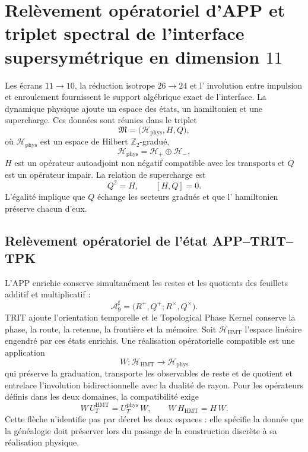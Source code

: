 \section[APP relevée et triplet spectral en dimension 11]{Relèvement opératoriel d'APP et triplet spectral de l'interface supersymétrique en dimension \texorpdfstring{\(11\)}{11}}
\label{sec:sucesor83-terna-espectral-teoria-m}

Les écrans \(11\to10\), la réduction isotrope \(26\to24\) et l'
involution entre impulsion et enroulement fournissent le support algébrique
exact de l'interface. La dynamique physique ajoute un espace des états, un
hamiltonien et une supercharge. Ces données sont réunies dans le triplet
\[
 \mathfrak M
 =\bigl(\mathcal H_{\mathrm{phys}},H,Q\bigr),
\]
où \(\mathcal H_{\mathrm{phys}}\) est un espace de Hilbert
\(\mathbb Z_2\)-gradué,
\[
 \mathcal H_{\mathrm{phys}}
 =\mathcal H_+\oplus\mathcal H_-,
\]
\(H\) est un opérateur autoadjoint non négatif compatible avec les transports
et \(Q\) est un opérateur impair. La relation de supercharge est
\begin{equation}
 Q^2=H,
 \qquad
 [H,Q]=0.
 \label{eq:sucesor83-supercarga-cuadrado-hamiltoniano}
\end{equation}
L'égalité implique que \(Q\) échange les secteurs gradués et que l'
hamiltonien préserve chacun d'eux.

\subsection{Relèvement opératoriel de l'état APP--TRIT--TPK}

L'APP enrichie conserve simultanément les restes et les quotients des
feuillets additif et multiplicatif :
\[
 \mathcal A_9^\sharp
 =\bigl(R^+,Q^+;R^\times,Q^\times\bigr).
\]
TRIT ajoute l'orientation temporelle et le Topological Phase Kernel conserve
la phase, la route, la retenue, la frontière et la mémoire. Soit
\(\mathcal H_{\mathrm{HMT}}\) l'espace linéaire engendré par ces états
enrichis. Une réalisation opératorielle compatible est une application
\[
 W:\mathcal H_{\mathrm{HMT}}
 \longrightarrow\mathcal H_{\mathrm{phys}}
\]
qui préserve la graduation, transporte les observables de reste et de quotient
et entrelace l'involution bidirectionnelle avec la dualité de rayon. Pour les
opérateurs définis dans les deux domaines, la compatibilité exige
\[
 W\,U_T^{\mathrm{HMT}}
 =U_T^{\mathrm{phys}}\,W,
 \qquad
 W\,H_{\mathrm{HMT}}
 =H\,W.
\]
Cette flèche n'identifie pas par décret les deux espaces : elle spécifie la donnée
que la généalogie doit préserver lors du passage de la construction discrète à sa
réalisation physique.

